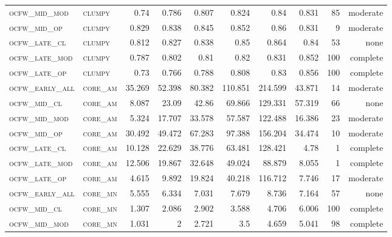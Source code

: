 \begin{landscape}
\begin{center}
\begin{footnotesize}
\begin{longtable}{llrrrrr|rrr}
\textsc{ocfw\_mid\_mod  } & \textsc{clumpy    }    & 0.74     & 0.786    & 0.807    & 0.824    & 0.84     & 0.831    & 85  & moderate \\
\textsc{ocfw\_mid\_op   } & \textsc{clumpy    }    & 0.829    & 0.838    & 0.845    & 0.852    & 0.86     & 0.831    & 9   & moderate \\
\textsc{ocfw\_late\_cl  } & \textsc{clumpy    }    & 0.812    & 0.827    & 0.838    & 0.85     & 0.864    & 0.84     & 53  & none     \\
\textsc{ocfw\_late\_mod } & \textsc{clumpy    }    & 0.787    & 0.802    & 0.81     & 0.82     & 0.831    & 0.852    & 100 & complete \\
\textsc{ocfw\_late\_op  } & \textsc{clumpy    }    & 0.73     & 0.766    & 0.788    & 0.808    & 0.83     & 0.856    & 100 & complete \\
\textsc{ocfw\_early\_all} & \textsc{core\_am  }    & 35.269   & 52.398   & 80.382   & 110.851  & 214.599  & 43.871   & 14  & moderate \\
\textsc{ocfw\_mid\_cl   } & \textsc{core\_am  }    & 8.087    & 23.09    & 42.86    & 69.866   & 129.331  & 57.319   & 66  & none     \\
\textsc{ocfw\_mid\_mod  } & \textsc{core\_am  }    & 5.324    & 17.707   & 33.578   & 57.587   & 122.488  & 16.386   & 23  & moderate \\
\textsc{ocfw\_mid\_op   } & \textsc{core\_am  }    & 30.492   & 49.472   & 67.283   & 97.388   & 156.204  & 34.474   & 10  & moderate \\
\textsc{ocfw\_late\_cl  } & \textsc{core\_am  }    & 10.128   & 22.629   & 38.776   & 63.481   & 128.421  & 4.78     & 1   & complete \\
\textsc{ocfw\_late\_mod } & \textsc{core\_am  }    & 12.506   & 19.867   & 32.648   & 49.024   & 88.879   & 8.055    & 1   & complete \\
\textsc{ocfw\_late\_op  } & \textsc{core\_am  }    & 4.615    & 9.892    & 19.824   & 40.218   & 116.712  & 7.746    & 17  & moderate \\
\textsc{ocfw\_early\_all} & \textsc{core\_mn  }    & 5.555    & 6.334    & 7.031    & 7.679    & 8.736    & 7.164    & 57  & none     \\
\textsc{ocfw\_mid\_cl   } & \textsc{core\_mn  }    & 1.307    & 2.086    & 2.902    & 3.588    & 4.706    & 6.006    & 100 & complete \\
\textsc{ocfw\_mid\_mod  } & \textsc{core\_mn  }    & 1.031    & 2        & 2.721    & 3.5      & 4.659    & 5.041    & 98  & complete \\

\end{longtable}
\end{footnotesize}
\end{center}
\end{landscape}
